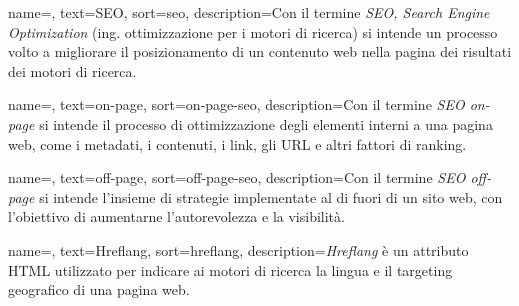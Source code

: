 








 {
    name=,
    text=SEO,
    sort=seo,
    description={Con il termine \emph{SEO, Search Engine Optimization} (ing. ottimizzazione per i motori di ricerca) si intende un processo volto a migliorare il posizionamento di un contenuto web nella pagina dei risultati dei motori di ricerca.}
}

 {
    name=,
    text=on-page,
    sort=on-page-seo,
    description={Con il termine \emph{SEO on-page} si intende il processo di ottimizzazione degli elementi interni a una pagina web, come i metadati, i contenuti, i link, gli URL e altri fattori di ranking.}
}

 {
    name=,
    text=off-page,
    sort=off-page-seo,
    description={Con il termine \emph{SEO off-page} si intende l'insieme di strategie implementate al di fuori di un sito web, con l'obiettivo di aumentarne l'autorevolezza e la visibilità.}
}

 {
    name=,
    text=Hreflang,
    sort=hreflang,
    description={\emph{Hreflang} è un attributo HTML utilizzato per indicare ai motori di ricerca la lingua e il targeting geografico di una pagina web.}
}


